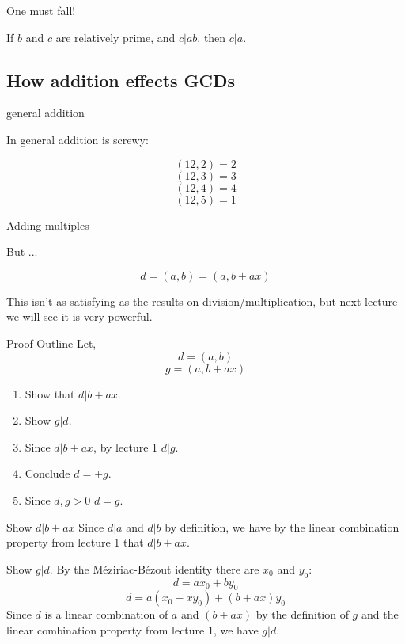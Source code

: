 \documentclass{beamer}
\begin{document}
\begin{frame}{One must fall!}

  If $b$ and $c$ are relatively prime, and $c | ab$, then $c|a$.

\end{frame}

\subsection{How addition effects GCDs}

\begin{frame}{general addition}

In general addition is screwy:

$$(12, 2) = 2$$
$$(12, 3) = 3$$
$$(12, 4) = 4$$
$$(12, 5) = 1$$

\end{frame}

\begin{frame}{Adding multiples}

But ...
\begin{theorem}
  $$d = (a, b) = (a, b + ax)$$
\end{theorem}

This isn't as satisfying as the results on division/multiplication,
but next lecture we will see it is very powerful.

\end{frame}

\begin{frame}{Proof Outline}
Let,
  $$d = (a, b) $$
  $$g = (a, b + ax)$$
  
  \begin{enumerate}
  \item Show that $d | b + ax$.
  \item Show $g | d$.
  \item Since $d | b + ax$, by lecture 1 $d | g$.
  \item Conclude $d = \pm g$.
  \item Since $d, g > 0$ $d = g$.
  \end{enumerate}
    
\end{frame}

\begin{frame}{Show $d | b + ax$}
  Since $d | a$ and $d | b$ by definition, we have by the linear
  combination property from lecture 1 that $d | b + ax$.
\end{frame}

\begin{frame}{Show $g | d$.}
  By the  M\'eziriac-B\'ezout identity there are $x_0$ and $y_0$:
  $$d = ax_0 + by_0$$
  $$d = a(x_0 - xy_0) + (b + ax)y_0$$
  Since $d$ is a linear combination of $a$ and $(b+ax)$ by the
  definition of $g$ and the linear combination property from lecture
  1, we have $g | d$.
\end{frame}
\end{document}
